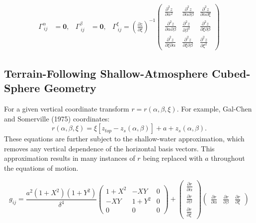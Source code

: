 \documentclass{article}
\newcommand{\vb}{\mathbf}
\newcommand{\pdiff}[2]{\frac{\partial #1}{\partial #2}}
\begin{document}
\begin{align}
\Gamma^{\alpha}_{\ i j} &= \vb{0}, & \Gamma^{\beta}_{\ i j} &= \vb{0}, & \Gamma^{\xi}_{\ i j} = \left( \pdiff{z}{\xi} \right)^{-1} \left( \begin{array}{ccc} \frac{\partial^2 z}{\partial \alpha^2} & \frac{\partial^2 z}{\partial \alpha \partial \beta} & \frac{\partial^2 z}{\partial \alpha \partial \xi} \\[2.0ex] \frac{\partial^2 z}{\partial \alpha \partial \beta} & \frac{\partial^2 z}{\partial \beta^2} & \frac{\partial^2 z}{\partial \xi \partial \beta} \\[2.0ex] \frac{\partial^2 z}{\partial \xi \partial \alpha} & \frac{\partial^2 z}{\partial \xi \partial \beta} & \frac{\partial^2 z}{\partial \xi^2} \end{array} \right)
\end{align}

\subsection{Terrain-Following Shallow-Atmosphere Cubed-Sphere Geometry}

For a given vertical coordinate transform $r = r(\alpha, \beta, \xi)$.  For example, Gal-Chen and Somerville (1975) coordinates:
\begin{equation}
r(\alpha, \beta, \xi) = \xi \left[ z_{top} - z_s(\alpha, \beta) \right] + a + z_s(\alpha, \beta).
\end{equation}  These equations are further subject to the shallow-water approximation, which removes any vertical dependence of the horizontal basis vectors.  This approximation results in many instances of $r$ being replaced with $a$ throughout the equations of motion.

\begin{equation}
g_{ij} = \frac{a^2 (1+X^2) (1+Y^2)}{\delta^4} \left( \begin{array}{ccc} 1+X^2 & - X Y & 0 \\[2.0ex] - X Y & 1+Y^2 & 0 \\[2.0ex] 0 & 0 & 0 \end{array} \right) + \left( \begin{array}{c} \pdiff{r}{\alpha} \\[2.0ex] \pdiff{r}{\beta} \\[2.0ex] \pdiff{r}{\xi} \end{array} \right) \left( \begin{array}{ccc} \pdiff{r}{\alpha} & \pdiff{r}{\beta} & \pdiff{r}{\xi} \end{array} \right)
\end{equation}
\end{document}

